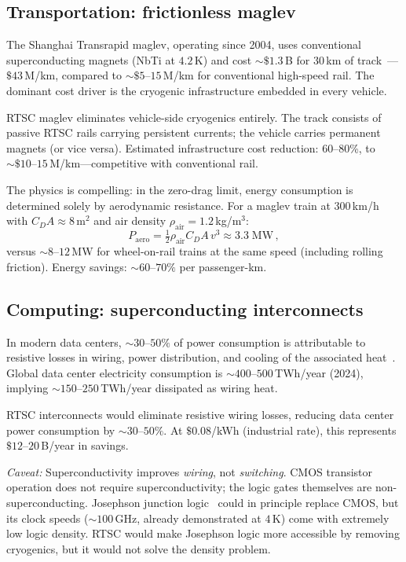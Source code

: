 \documentclass[prl,twocolumn,superscriptaddress,longbibliography,floatfix]{revtex4-2}
\begin{document}
\subsection{Transportation: frictionless maglev}

The Shanghai Transrapid maglev, operating since 2004, uses
conventional superconducting magnets (NbTi at $4.2\,$K) and
cost $\sim \$1.3\,$B for $30\,$km of
track~\cite{Shanghai2006}---$\$43\,$M/km, compared to
$\sim \$5$--$15\,$M/km for conventional high-speed rail.
The dominant cost driver is the cryogenic infrastructure
embedded in every vehicle.

RTSC maglev eliminates vehicle-side cryogenics entirely.
The track consists of passive RTSC rails carrying persistent
currents; the vehicle carries permanent magnets (or vice
versa).  Estimated infrastructure cost reduction:
60--80\%, to $\sim \$10$--$15\,$M/km---competitive with
conventional rail.

The physics is compelling: in the zero-drag limit, energy
consumption is determined solely by aerodynamic resistance.
For a maglev train at $300\,$km/h with $C_D A \approx 8\,$m$^2$
and air density $\rho_{\mathrm{air}} = 1.2\,$kg/m$^3$:
\begin{equation}\label{eq:drag}
  P_{\mathrm{aero}} = \tfrac{1}{2}\rho_{\mathrm{air}} C_D A\, v^3
  \approx 3.3\;\mathrm{MW}\,,
\end{equation}
versus $\sim 8$--$12\,$MW for wheel-on-rail trains at the
same speed (including rolling friction).  Energy savings:
$\sim 60$--$70\%$ per passenger-km.

\subsection{Computing: superconducting interconnects}

In modern data centers, $\sim 30$--$50\%$ of power consumption
is attributable to resistive losses in wiring, power
distribution, and cooling of the associated
heat~\cite{Shehabi2016}.  Global data center electricity
consumption is $\sim 400$--$500\,$TWh/year (2024), implying
$\sim 150$--$250\,$TWh/year dissipated as wiring heat.

RTSC interconnects would eliminate resistive wiring losses,
reducing data center power consumption by $\sim 30$--$50\%$.
At $\$0.08$/kWh (industrial rate), this represents
$\$12$--$20\,$B/year in savings.

\emph{Caveat:} Superconductivity improves \emph{wiring}, not
\emph{switching}.  CMOS transistor operation does not require
superconductivity; the logic gates themselves are
non-superconducting.  Josephson junction logic~\cite{Likharev1991}
could in principle replace CMOS, but its clock speeds
($\sim 100\,$GHz, already demonstrated at $4\,$K) come with
extremely low logic density.  RTSC would make Josephson logic
more accessible by removing cryogenics, but it would not
solve the density problem.
\end{document}
